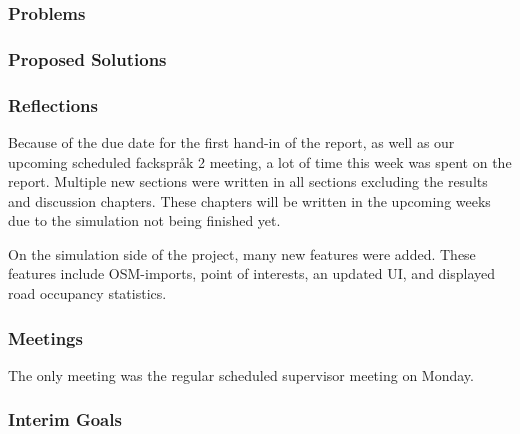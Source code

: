 \subsubsection{Problems}


\subsubsection{Proposed Solutions}


\subsubsection{Reflections}

    Because of the due date for the first hand-in of the report, as well as our upcoming scheduled fackspråk 2 meeting, a lot of time this week was spent on the report. Multiple new sections were written in all sections excluding the results and discussion chapters. These chapters will be written in the upcoming weeks due to the simulation not being finished yet.

    On the simulation side of the project, many new features were added. These features include OSM-imports, point of interests, an updated UI, and displayed road occupancy statistics.

\subsubsection{Meetings}

    The only meeting was the regular scheduled supervisor meeting on Monday.

\subsubsection{Interim Goals}



